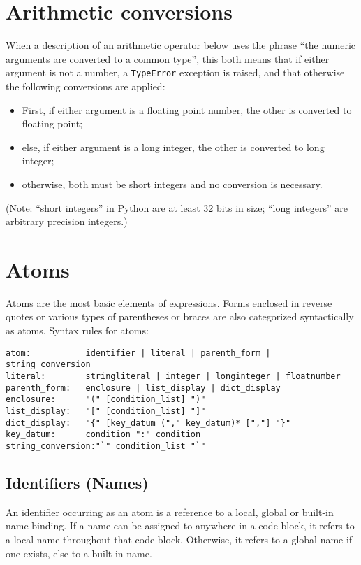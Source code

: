 \section{Arithmetic conversions}

When a description of an arithmetic operator below uses the phrase
``the numeric arguments are converted to a common type'',
this both means that if either argument is not a number, a
{\tt TypeError} exception is raised, and that otherwise
the following conversions are applied:

\begin{itemize}
\item	First, if either argument is a floating point number,
	the other is converted to floating point;
\item	else, if either argument is a long integer,
	the other is converted to long integer;
\item	otherwise, both must be short integers and no conversion
	is necessary.
\end{itemize}

(Note: ``short integers'' in Python are at least 32 bits in size;
``long integers'' are arbitrary precision integers.)

\section{Atoms}

Atoms are the most basic elements of expressions.
Forms enclosed in reverse quotes or various types of parentheses
or braces are also categorized syntactically as atoms.
Syntax rules for atoms:

\begin{verbatim}
atom:           identifier | literal | parenth_form | string_conversion
literal:        stringliteral | integer | longinteger | floatnumber
parenth_form:   enclosure | list_display | dict_display
enclosure:      "(" [condition_list] ")"
list_display:   "[" [condition_list] "]"
dict_display:   "{" [key_datum ("," key_datum)* [","] "}"
key_datum:      condition ":" condition
string_conversion:"`" condition_list "`"
\end{verbatim}

\subsection{Identifiers (Names)}

An identifier occurring as an atom is a reference to a local, global
or built-in name binding.  If a name can be assigned to anywhere in a code
block, it refers to a local name throughout that code block.
Otherwise, it refers to a global name if one exists, else to a
built-in name.

